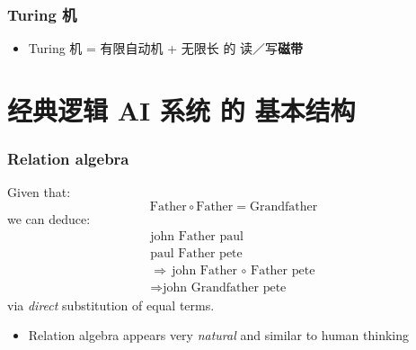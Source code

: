 \documentclass[17pt]{beamer}
\begin{document}
\begin{frame}
\frametitle{Turing 机}
\begin{itemize}
	\item Turing 机 = 有限自动机 + 无限长 的 读／写\textbf{磁带}
\end{itemize}
\end{frame}

\section[经典逻辑 AI 系统 的基本结构]{\texorpdfstring{经典逻辑 AI 系统 的 \linebreak[0] 基本结构}{经典逻辑 AI 系统 的 基本结构}}
\frame{\sectionpage}





\begin{frame}
\frametitle{Relation algebra}
Given that:
\begin{equation}
\mbox{Father} \circ \mbox{Father} = \mbox{Grandfather}
\end{equation}
we can deduce:
\begin{eqnarray}
\mbox{john Father paul} \\
\mbox{paul Father pete} \\
\Rightarrow \mbox{john Father $\circ$ Father pete} \\
\Rightarrow \mbox{john Grandfather pete}
\end{eqnarray}
via \textit{direct} substitution of equal terms.
\begin{itemize}
	\item  Relation algebra appears very \textit{natural} and similar to human thinking
\end{itemize}
\end{frame}
\end{document}
